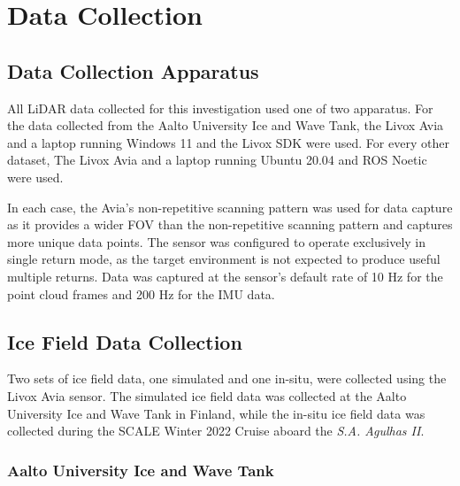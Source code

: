 \chapter{Data Collection}
\label{ch:data_collection}

\section{Data Collection Apparatus}
\label{sec:ch4.section1}

All \ac{LiDAR} data collected for this investigation used one of two apparatus. For the data collected from the Aalto University Ice and Wave Tank, the Livox Avia and a laptop running Windows 11 and the Livox SDK were used. For every other dataset, The Livox Avia and a laptop running Ubuntu 20.04 and \ac{ROS} Noetic were used.

In each case, the Avia's non-repetitive scanning pattern was used for data capture as it provides a wider \ac{FOV} than the non-repetitive scanning pattern and captures more unique data points. The sensor was configured to operate exclusively in single return mode, as the target environment is not expected to produce useful multiple returns. Data was captured at the sensor's default rate of 10 Hz for the point cloud frames and 200 Hz for the \ac{IMU} data.

\section{Ice Field Data Collection}
\label{sec:ch4.section2}

Two sets of ice field data, one simulated and one in-situ, were collected using the Livox Avia sensor. The simulated ice field data was collected at the Aalto University Ice and Wave Tank in Finland, while the in-situ ice field data was collected during the \ac{SCALE} Winter 2022 Cruise aboard the \textit{S.A. Agulhas II}. 

\subsection{Aalto University Ice and Wave Tank}
\label{subsec:ch4.section2.subsec1}

